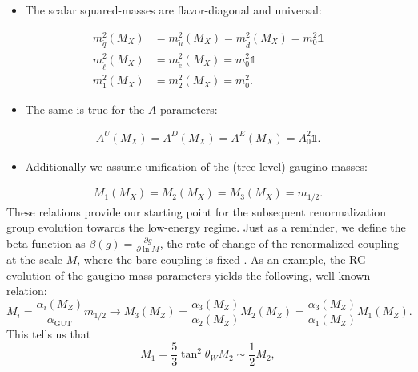 \begin{itemize}
		\item The scalar squared-masses are flavor-diagonal and universal: 
	\end{itemize}
	\begin{equation}
	\begin{aligned}
				m^2_{\tilde{q}}(M_X) &= 	m^2_{\tilde{u}}(M_X) = m^2_{\tilde{d}}(M_X) = m_0^2 \mathbb{1} \\[0.5em]
				m^2_{\tilde{\ell}}(M_X) &= 	m^2_{\tilde{e}}(M_X) = m_0^2 \mathbb{1} \\[0.5em]
				m^2_{1}(M_X) &= 	m^2_{2}(M_X) = m_0^2 .
	\end{aligned}
	\end{equation}
		\begin{itemize}
		\item The same is true for the $A$-parameters:
	\end{itemize}
	\begin{equation}
	\begin{aligned}
				A^{U} (M_X) = A^{D} (M_X) = A^{E} (M_X) = A_0^2 \mathbb{1}.
	\end{aligned}
	\end{equation}
	\begin{itemize}
		\item Additionally we assume unification of the (tree level) gaugino masses:
		\end{itemize}
	 \begin{align}
				M_1 (M_X) = M_2 (M_X) = M_3 (M_X) = m_{1/2}. 
	\end{align}
These relations provide our starting point for the subsequent renormalization group evolution towards the low-energy regime. Just as a reminder, we define the beta function as $\beta(g) = \frac{\partial g}{\partial \operatorname{ln} M}$, the rate of change of the renormalized coupling at the scale $M$, where the bare coupling is fixed \cite{PeskinSchroeder1995}. As an example, the RG evolution of the gaugino mass parameters yields the following, well known relation:
\begin{equation}
	M_{i}=\frac{\alpha_{i}\left(M_{Z}\right)}{\alpha_{\mathrm{GUT}}} m_{1 / 2} \longrightarrow M_{3}\left(M_{Z}\right)=\frac{\alpha_{3}\left(M_{Z}\right)}{\alpha_{2}\left(M_{Z}\right)} M_{2}\left(M_{Z}\right)=\frac{\alpha_{3}\left(M_{Z}\right)}{\alpha_{1}\left(M_{Z}\right)} M_{1}\left(M_{Z}\right).
\end{equation}
	This tells us that
	\begin{equation}
		M_{1}=\frac{5}{3} \tan ^{2} \theta_{W} M_{2} \sim \frac{1}{2} M_{2},
\end{equation}
